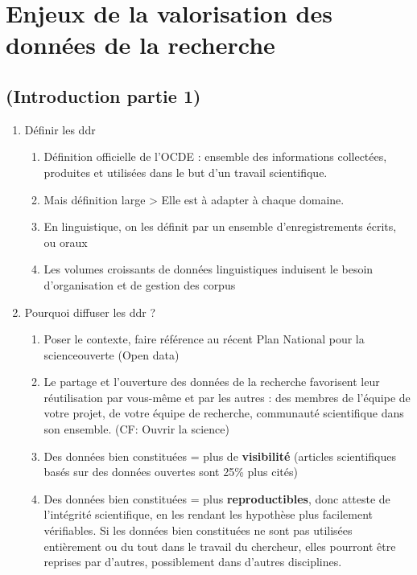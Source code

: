 \documentclass{book}
\begin{document}
\chapter{Enjeux de la valorisation des données de la recherche}

\section*{(Introduction partie 1)}

\begin{enumerate}
	\item Définir les \gls{ddr}
        \begin{enumerate}
            \item Définition officielle de l'OCDE : ensemble des informations collectées, produites et utilisées dans le but d'un travail scientifique.
            \item Mais définition large > Elle est à adapter à chaque domaine. \autocite{rebouillat:tel-02447653} 
            \item En linguistique, on les définit par un ensemble d'enregistrements écrits, ou oraux
            \item Les volumes croissants de données linguistiques induisent le besoin d'organisation et de gestion des corpus \autocite{minel:halshs-01590750} 
        \end{enumerate}
	\item Pourquoi diffuser les \gls{ddr} ?
        \begin{enumerate}
            \item Poser le contexte, faire référence au récent Plan National pour la \gls{scienceouverte} (Open data)
            \item Le partage et l’ouverture des données de la recherche favorisent leur réutilisation par vous-même et par les autres : des membres de l’équipe de votre projet, de votre équipe de recherche, communauté scientifique dans son ensemble. (CF: Ouvrir la science)
            \item Des données bien constituées = plus de \textbf{visibilité} (articles scientifiques basés sur des données ouvertes sont 25\% plus cités)
            \item Des données bien constituées = plus \textbf{reproductibles}, donc atteste de l'intégrité scientifique, en les rendant les hypothèse plus facilement vérifiables. Si les données bien constituées ne sont pas utilisées entièrement ou du tout dans le travail du chercheur, elles pourront être reprises par d'autres, possiblement dans d'autres disciplines.
        \end{enumerate}
\end{enumerate}
\end{document}
